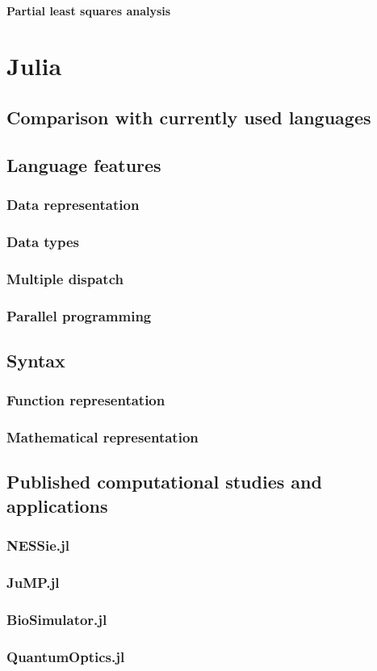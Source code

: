 \paragraph{Partial least squares analysis}


\section{Julia}

\subsection{Comparison with currently used languages}
\subsection{Language features}
\subsubsection{Data representation}
\subsubsection{Data types}
\subsubsection{Multiple dispatch}
\subsubsection{Parallel programming}
\subsection{Syntax}
\subsubsection{Function representation}
\subsubsection{Mathematical representation}
\subsection{Published computational studies and applications}
\subsubsection{NESSie.jl}
\subsubsection{JuMP.jl}
\subsubsection{BioSimulator.jl}
\subsubsection{QuantumOptics.jl}
